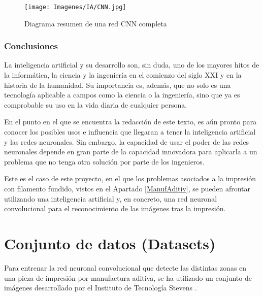 \documentclass{report}
\begin{document}
\vspace{0.4cm}
\begin{figure}[H]
    \centering
    \texttt{[image: Imagenes/IA/CNN.jpg]}
    \caption{ Diagrama resumen de una red CNN completa \cite{BuenArticuloConvolucion}}
    \label{fig:CNN}
\end{figure}
\vspace{0.4cm}




\subsection{Conclusiones}


La inteligencia artificial y su desarrollo son, sin duda, uno de los mayores hitos de la informática, la ciencia y la ingeniería en el comienzo del siglo XXI y en la historia de la humanidad. Su importancia es, además, que no solo es una tecnología aplicable a campos como la ciencia o la ingeniería, sino que ya es comprobable su uso en la vida diaria de cualquier persona.

En el punto en el que se encuentra la redacción de este texto, es aún pronto para conocer los posibles usos e influencia que llegaran a tener la inteligencia artificial y las redes neuronales. Sin embargo, la capacidad de usar el poder de las redes neuronales depende en gran parte de la capacidad innovadora para aplicarla a un problema que no tenga otra solución por parte de los ingenieros. 

Este es el caso de este proyecto, en el que los problemas asociados a la impresión con filamento fundido, vistos en el Apartado \ref{ManufAditiv}, se pueden afrontar utilizando una inteligencia artificial y, en concreto, una red neuronal convolucional para el reconocimiento de las imágenes tras la impresión.



















\chapter{Conjunto de datos (Datasets)}\label{section:Dataset}


Para entrenar la red neuronal convolucional que detecte las distintas zonas en una pieza de impresión por manufactura aditiva, se ha utilizado un conjunto de imágenes desarrollado por el Instituto de Tecnología Stevens \cite{AMDataset}.
\end{document}
